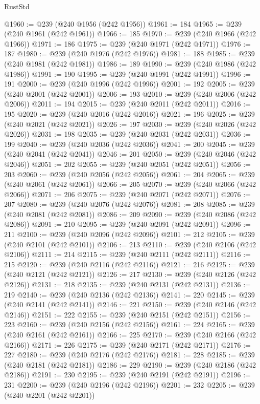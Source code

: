 \begin{lexlean}{RustStd}
\begin{coremodule}
@1960 := @239 (@240 @1956 (@242 @1956))
@1961 := 184
@1965 := @239 (@240 @1961 (@242 @1961))
@1966 := 185
@1970 := @239 (@240 @1966 (@242 @1966))
@1971 := 186
@1975 := @239 (@240 @1971 (@242 @1971))
@1976 := 187
@1980 := @239 (@240 @1976 (@242 @1976))
@1981 := 188
@1985 := @239 (@240 @1981 (@242 @1981))
@1986 := 189
@1990 := @239 (@240 @1986 (@242 @1986))
@1991 := 190
@1995 := @239 (@240 @1991 (@242 @1991))
@1996 := 191
@2000 := @239 (@240 @1996 (@242 @1996))
@2001 := 192
@2005 := @239 (@240 @2001 (@242 @2001))
@2006 := 193
@2010 := @239 (@240 @2006 (@242 @2006))
@2011 := 194
@2015 := @239 (@240 @2011 (@242 @2011))
@2016 := 195
@2020 := @239 (@240 @2016 (@242 @2016))
@2021 := 196
@2025 := @239 (@240 @2021 (@242 @2021))
@2026 := 197
@2030 := @239 (@240 @2026 (@242 @2026))
@2031 := 198
@2035 := @239 (@240 @2031 (@242 @2031))
@2036 := 199
@2040 := @239 (@240 @2036 (@242 @2036))
@2041 := 200
@2045 := @239 (@240 @2041 (@242 @2041))
@2046 := 201
@2050 := @239 (@240 @2046 (@242 @2046))
@2051 := 202
@2055 := @239 (@240 @2051 (@242 @2051))
@2056 := 203
@2060 := @239 (@240 @2056 (@242 @2056))
@2061 := 204
@2065 := @239 (@240 @2061 (@242 @2061))
@2066 := 205
@2070 := @239 (@240 @2066 (@242 @2066))
@2071 := 206
@2075 := @239 (@240 @2071 (@242 @2071))
@2076 := 207
@2080 := @239 (@240 @2076 (@242 @2076))
@2081 := 208
@2085 := @239 (@240 @2081 (@242 @2081))
@2086 := 209
@2090 := @239 (@240 @2086 (@242 @2086))
@2091 := 210
@2095 := @239 (@240 @2091 (@242 @2091))
@2096 := 211
@2100 := @239 (@240 @2096 (@242 @2096))
@2101 := 212
@2105 := @239 (@240 @2101 (@242 @2101))
@2106 := 213
@2110 := @239 (@240 @2106 (@242 @2106))
@2111 := 214
@2115 := @239 (@240 @2111 (@242 @2111))
@2116 := 215
@2120 := @239 (@240 @2116 (@242 @2116))
@2121 := 216
@2125 := @239 (@240 @2121 (@242 @2121))
@2126 := 217
@2130 := @239 (@240 @2126 (@242 @2126))
@2131 := 218
@2135 := @239 (@240 @2131 (@242 @2131))
@2136 := 219
@2140 := @239 (@240 @2136 (@242 @2136))
@2141 := 220
@2145 := @239 (@240 @2141 (@242 @2141))
@2146 := 221
@2150 := @239 (@240 @2146 (@242 @2146))
@2151 := 222
@2155 := @239 (@240 @2151 (@242 @2151))
@2156 := 223
@2160 := @239 (@240 @2156 (@242 @2156))
@2161 := 224
@2165 := @239 (@240 @2161 (@242 @2161))
@2166 := 225
@2170 := @239 (@240 @2166 (@242 @2166))
@2171 := 226
@2175 := @239 (@240 @2171 (@242 @2171))
@2176 := 227
@2180 := @239 (@240 @2176 (@242 @2176))
@2181 := 228
@2185 := @239 (@240 @2181 (@242 @2181))
@2186 := 229
@2190 := @239 (@240 @2186 (@242 @2186))
@2191 := 230
@2195 := @239 (@240 @2191 (@242 @2191))
@2196 := 231
@2200 := @239 (@240 @2196 (@242 @2196))
@2201 := 232
@2205 := @239 (@240 @2201 (@242 @2201))

\end{coremodule}
\end{lexlean}
